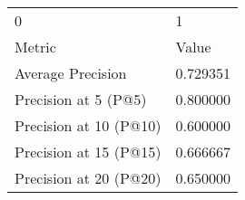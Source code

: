 \begin{tabular}{ll}
0 & 1 \\
Metric & Value \\
Average Precision & 0.729351 \\
Precision at 5 (P@5) & 0.800000 \\
Precision at 10 (P@10) & 0.600000 \\
Precision at 15 (P@15) & 0.666667 \\
Precision at 20 (P@20) & 0.650000 \\
\end{tabular}

